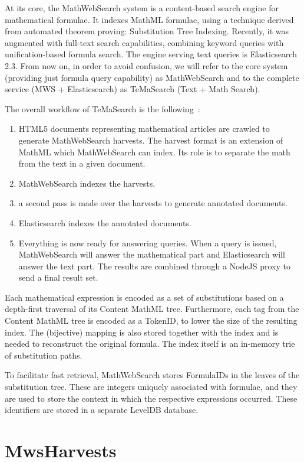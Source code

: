 \documentclass{deliverablereport}
\def\MWS{\textsf{MathWebSearch}\xspace}
\begin{document}
At its core, the \MWS system is a content-based search engine for mathematical
formulae. It indexes MathML formulae, using a technique derived from automated theorem
proving: Substitution Tree Indexing. Recently, it was augmented with full-text search
capabilities, combining keyword queries with unification-based formula search. The engine
serving text queries is Elasticsearch 2.3. From now on, in order to avoid confusion, we
will refer to the core system (providing just formula query capability) as \MWS and to the
complete service (MWS + Elasticsearch) as TeMaSearch (Text + Math Search).

The overall workflow of TeMaSearch is the following~\cite{Ham:bcs15}: 

\begin{enumerate}
\item HTML5 documents representing mathematical articles are crawled to generate \MWS
  harvests. The harvest format is an extension of MathML which \MWS can index. Its role is
  to separate the math from the text in a given document.
\item \MWS indexes the harvests.
\item a second pass is made over the harvests to generate annotated documents.
\item Elasticsearch indexes the annotated documents.
\item Everything is now ready for answering queries. When a query is issued, \MWS will
  answer the mathematical part and Elasticsearch will answer the text part. The results
  are combined through a NodeJS proxy to send a final result set.
\end{enumerate}

Each mathematical expression is encoded as a set of substitutions based on a depth-first
traversal of its Content MathML tree. Furthermore, each tag from the Content MathML tree
is encoded as a TokenID, to lower the size of the resulting index. The (bijective) mapping
is also stored together with the index and is needed to reconstruct the original
formula. The index itself is an in-memory trie of substitution paths.

To facilitate fast retrieval, \MWS stores FormulaIDs in the leaves of the substitution
tree. These are integers uniquely associated with formulae, and they are used to store the
context in which the respective expressions occurred. These identifiers are stored in a
separate LevelDB database.

\section{MwsHarvests}\label{sec:harvests}
\end{document}
